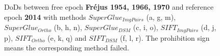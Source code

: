\begin{figure}[htbp]
\begin{center}
        \caption{{\scriptsize \ac{DoD}s between free epoch \textbf{Fr{\'e}jus 1954, 1966, 1970} and reference epoch \textbf{2014} with methods $SuperGlue_{ImgPairs}$ (a, g, m), $SuperGlue_{Ortho}$ (b, h, n), $SuperGlue_{DSM}$ (c, i, o), $SIFT_{ImgPairs}$ (d, j, p), $SIFT_{Ortho}$ (e, k, q) and $SIFT_{DSM}$ (f, l, r). The prohibition sign means the corresponding method failed.}}
        \label{DoDFrejus}
    \end{center}
\end{figure} 




